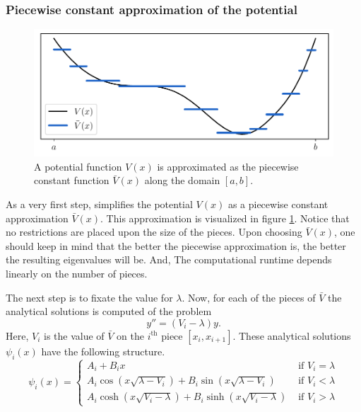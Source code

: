 \subsubsection{Piecewise constant approximation of the potential}

\begin{figure}
    \begin{center}
        \includegraphics[width=\textwidth]{img/chapter2/cpm_constant_approx.pdf}
        \caption{A potential function $V(x)$ is approximated as the piecewise constant function $\bar{V}(x)$ along the domain $[a, b]$.}
        \label{fig:c2_cpm_constant_approx}
    \end{center}
\end{figure}

As a very first step, \cite{canosa_new_1970} simplifies the potential $V(x)$ as a piecewise constant approximation $\bar{V}(x)$. This approximation is visualized in figure \ref{fig:c2_cpm_constant_approx}. Notice that no restrictions are placed upon the size of the pieces. Upon choosing $\bar{V}(x)$, one should keep in mind that the better the piecewise approximation is, the better the resulting eigenvalues will be. And, The computational runtime depends linearly on the number of pieces.

The next step is to fixate the value for $\lambda$. Now, for each of the pieces of $\bar{V}$ the analytical solutions is computed of the problem
$$
    y'' = (V_i - \lambda) y\text{.}
$$
Here, $V_i$ is the value of $\bar{V}$ on the $i^\text{th}$ piece $[x_i, x_{i+1}]$. These analytical solutions $\psi_i(x)$ have the following structure.
$$
    \psi_i(x) = \begin{cases}
        A_i + B_i x                                                         & \text{ if $V_i = \lambda$} \\
        A_i \cos(x\sqrt{\lambda - V_i}) + B_i \sin(x\sqrt{\lambda - V_i})   & \text{ if $V_i < \lambda$} \\
        A_i \cosh(x\sqrt{V_i - \lambda}) + B_i \sinh(x\sqrt{V_i - \lambda}) & \text{ if $V_i > \lambda$}
    \end{cases}
$$

